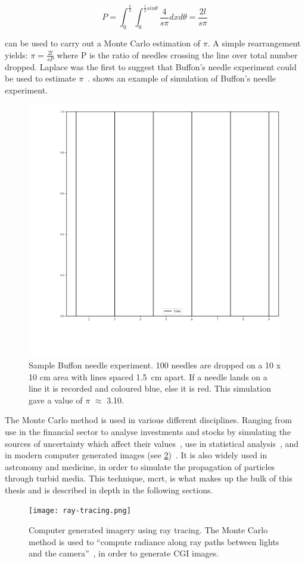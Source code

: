 \begin{equation}
P=\int_0^{\frac{\pi}{2}}\int_0^{\frac{l}{2}sin\theta}\frac{4}{s\pi}dx d\theta = \frac{2 l}{s \pi}\label{eqn:buffon}
\end{equation}


 can be used to carry out a Monte Carlo estimation of $\pi$. A simple rearrangement yields: $\pi = \tfrac{2l}{sP}$ where P is the ratio of needles crossing the line over total number dropped. Laplace was the first to suggest that Buffon's needle experiment could be used to estimate $\pi$~\cite{beckmann2015history}.  shows an example of simulation of Buffon's needle experiment.

\begin{figure}[!htb]
\centering
\includegraphics[width=.5\textwidth]{buffon.pdf}
\caption{Sample Buffon needle experiment. 100 needles are dropped on a 10 x 10 cm area with lines spaced 1.5~cm apart. If a needle lands on a line it is recorded and coloured blue, else it is red. This simulation gave a value of $\pi$ $\approx$ 3.10.}
\label{fig:buffon-needle}
\end{figure}

The Monte Carlo method is used in various different disciplines. Ranging from use in the financial sector to analyse investments and stocks by simulating the sources of uncertainty which affect their values~\cite{jackel2002monte,finaceprrof}, use in statistical analysis~\cite{wall2012practical}, and in modern computer generated images (see \cref{fig:ray-trace})~\cite{Kajiyarendering,Cookraytracing}. It is also widely used in astronomy and medicine, in order to simulate the propagation of particles through turbid media. This technique, \gls{mcrt}, is what makes up the bulk of this thesis and is described in depth in the following sections.

\begin{figure}[!htb]
\centering
\texttt{[image: ray-tracing.png]}
\caption{Computer generated imagery using ray tracing. The Monte Carlo method is used to ``compute radiance along ray paths between lights and the camera''~\cite{pharr2016physically}, in order to generate CGI images.}
\label{fig:ray-trace}
\end{figure}

